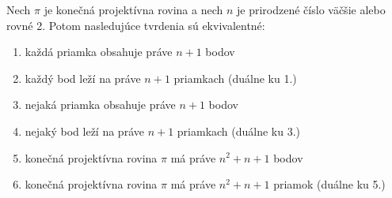 \begin{theorem}
\label{th:fpp_props}
Nech $\pi$ je konečná projektívna rovina 
a nech $n$ je prirodzené 
číslo väčšie alebo rovné 2. 
Potom nasledujúce tvrdenia sú ekvivalentné:
\begin{enumerate}
    \item každá priamka obsahuje práve $n+1$ bodov
    \item každý bod leží na práve $n+1$ priamkach (duálne ku 1.)
    \item nejaká priamka obsahuje práve $n+1$ bodov
    \item nejaký bod leží na práve $n+1$ priamkach (duálne ku 3.)
    \item konečná projektívna rovina $\pi$ má práve $n^2+n+1$ bodov 
    \item konečná projektívna rovina $\pi$ má práve $n^2+n+1$ priamok (duálne ku 5.)
\end{enumerate}
\end{theorem}
